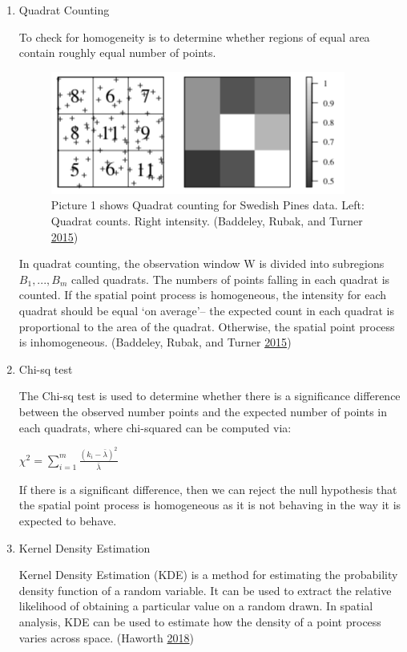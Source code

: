 \documentclass[]{article}
\theoremstyle{definition}
\theoremstyle{definition}
\theoremstyle{definition}
\theoremstyle{remark}
\begin{document}
\begin{enumerate}
\def\labelenumi{\arabic{enumi}.}
\item
  Quadrat Counting

  To check for homogeneity is to determine whether regions of equal area
  contain roughly equal number of points.

  \begin{figure}
  \centering
  \includegraphics{pictures/quadratcount.png}
  \caption{Picture 1 shows Quadrat counting for Swedish Pines data.
  Left: Quadrat counts. Right intensity. (Baddeley, Rubak, and Turner
  \protect\hyperlink{ref-Baddeley2016}{2015})}
  \end{figure}

  In quadrat counting, the observation window W is divided into
  subregions \(B_{1},...,B_{m}\) called quadrats. The numbers of points
  falling in each quadrat is counted. If the spatial point process is
  homogeneous, the intensity for each quadrat should be equal `on
  average'-- the expected count in each quadrat is proportional to the
  area of the quadrat. Otherwise, the spatial point process is
  inhomogeneous. (Baddeley, Rubak, and Turner
  \protect\hyperlink{ref-Baddeley2016}{2015})
\item
  Chi-sq test

  The Chi-sq test is used to determine whether there is a significance
  difference between the observed number points and the expected number
  of points in each quadrats, where chi-squared can be computed via:

  \(\chi^2=\sum_{i=1}^m\frac{(k_i-\bar{\lambda})^2}{\bar{\lambda}}\)

  If there is a significant difference, then we can reject the null
  hypothesis that the spatial point process is homogeneous as it is not
  behaving in the way it is expected to behave.
\item
  Kernel Density Estimation

  Kernel Density Estimation (KDE) is a method for estimating the
  probability density function of a random variable. It can be used to
  extract the relative likelihood of obtaining a particular value on a
  random drawn. In spatial analysis, KDE can be used to estimate how the
  density of a point process varies across space. (Haworth
  \protect\hyperlink{ref-Haworth2018}{2018})


\end{enumerate}
\end{document}
